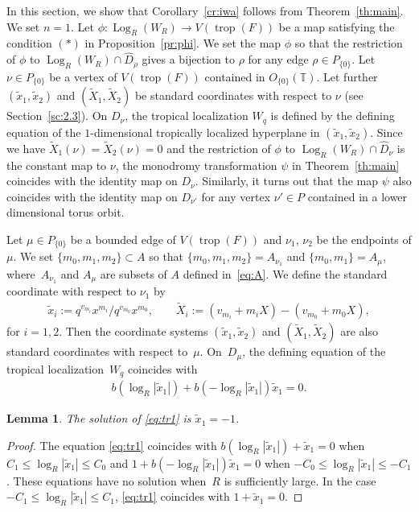 \documentclass[pdftex]{sigma}
\numberwithin{equation}{section}
\newtheorem{Lemma}[Theorem]{Lemma}
\begin{document}
In this section, we show that Corollary~\ref{cr:iwa} follows from Theorem~\ref{th:main}. We set $n=1$. Let $\phi \colon \operatorname{Log}_R(W_R) \to V(\operatorname{trop}(F))$ be a map satisfying the condition $(\ast)$ in Proposition~\ref{pr:phi}. We set the map $\phi$ so that the restriction of $\phi$ to $\operatorname{Log}_R(W_R) \cap \widehat{D}_\rho$ gives a bijection to $\rho$ for any edge $\rho \in P_{\{0\}}$. Let $\nu \in P_{\{0\}}$ be a vertex of $V(\operatorname{trop}(F))$ contained in $O_{\{0\}}({\mathbb T})$. Let further $(\tilde{x}_1,\tilde{x}_2)$ and $(\widetilde{X}_1, \widetilde{X}_2)$ be standard coordinates with respect to $\nu$ (see Section~\ref{sc:2.3}). On $D_\nu$, the tropical localization $W_q$ is def\/ined by the def\/ining equation of the $1$-dimensional tropically localized hyperplane in $(\tilde{x}_1, \tilde{x}_2)$. Since we have $\widetilde{X}_1(\nu)=\widetilde{X}_2(\nu)=0$ and the restriction of $\phi$ to $\operatorname{Log}_R(W_R) \cap \widehat{D}_\nu$ is the constant map to $\nu$, the monodromy transformation $\psi$ in Theorem~\ref{th:main} coincides with the identity map on $D_\nu$. Similarly, it turns out that the map $\psi$ also coincides with the identity map on $D_{\nu'}$ for any vertex $\nu' \in P$ contained in a lower dimensional torus orbit.

Let $\mu \in P_{\{0\}}$ be a bounded edge of $V(\operatorname{trop}(F))$ and $\nu_1$, $\nu_2$ be the endpoints of $\mu$. We set $\{m_0, m_1, m_2\} \subset A$ so that $\{m_0, m_1, m_2\}=A_{\nu_1}$ and $\{m_0, m_1\}=A_\mu$, where~$A_{\nu_1}$ and $A_{\mu}$ are subsets of $A$ def\/ined in~\eqref{eq:A}. We def\/ine the standard coordinate with respect to $\nu_1$ by
\begin{gather*}
\tilde{x}_i :=q^{v_{m_i}}x^{m_i} / q^{v_{m_0}}x^{m_0}, \qquad \widetilde{X}_i:=(v_{m_i}+m_iX)-(v_{m_0}+m_0X),
\end{gather*}
for $i=1,2$. Then the coordinate systems $(\tilde{x}_1,\tilde{x}_2)$ and $(\widetilde{X}_1, \widetilde{X}_2)$ are also standard coordinates with respect to~$\mu$. On~$D_\mu$, the def\/ining equation of the tropical localization~$W_q$ coincides with
\begin{gather}\label{eq:tr1}
b(\log_R|\tilde{x}_1|)+b(-\log_R|\tilde{x}_1|)\tilde{x}_1=0.
\end{gather}

\begin{Lemma} The solution of \eqref{eq:tr1} is $\tilde{x}_1=-1$.
\end{Lemma}
\begin{proof}The equation \eqref{eq:tr1} coincides with $b(\log_R|\tilde{x}_1|)+\tilde{x}_1=0$ when $C_1 \leq \log_R|\tilde{x}_1| \leq C_0$ and $1+b(-\log_R|\tilde{x}_1|)\tilde{x}_1=0$ when $-C_0 \leq \log_R|\tilde{x}_1| \leq -C_1$. These equations have no solution when~$R$ is suf\/f\/iciently large.
In the case $-C_1 \leq \log_R|\tilde{x}_1| \leq C_1$, \eqref{eq:tr1} coincides with $1+\tilde{x}_1=0$.
\end{proof}
\end{document}
